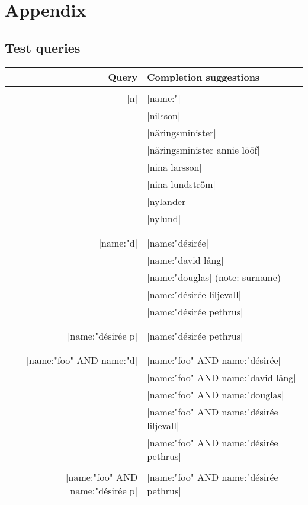 \newpage
\section*{Appendix}\label{appendix}

\subsection*{Test queries}
\begin{tabular}{ r | l}
    Query & Completion suggestions \\    
    \hline                    
    & \\
  |n| & |name:"| \\
      & |nilsson| \\
      & |näringsminister| \\
      & |näringsminister annie lööf| \\
      & |nina larsson| \\
      & |nina lundström| \\
      & |nylander| \\
      & |nylund| \\
      & \\
    \hline
    & \\
  |name:"d| & |name:"désirée| \\
            & |name:"david lång| \\
            & |name:"douglas| \footnotesize{(note: surname)}\\
            & |name:"désirée liljevall| \\
            & |name:"désirée pethrus| \\
            & \\
    \hline
    & \\
    |name:"désirée p| & |name:"désirée pethrus| \\
    & \\
    \hline
    & \\
    |name:"foo" AND name:"d| & |name:"foo" AND name:"désirée| \\
                           & |name:"foo" AND name:"david lång| \\
                           & |name:"foo" AND name:"douglas| \\
                           & |name:"foo" AND name:"désirée liljevall| \\
                           & |name:"foo" AND name:"désirée pethrus| \\
                           & \\
    \hline
    |name:"foo" AND name:"désirée p| & |name:"foo" AND name:"désirée pethrus| \\
\end{tabular}

